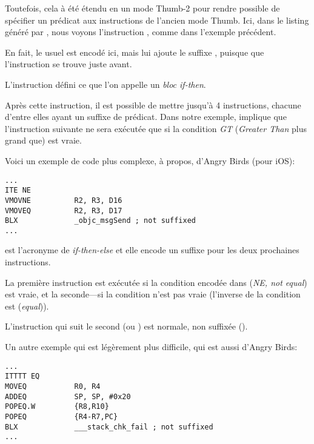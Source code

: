 
Toutefois, cela à été étendu en un mode Thumb-2 pour rendre possible de spécifier
un prédicat aux instructions de l'ancien mode Thumb.
Ici, dans le listing généré par \IDA, nous voyons l'instruction , comme
dans l'exemple précédent.

En fait, le  usuel est encodé ici, mais \IDA lui ajoute le suffixe ,
puisque que l'instruction  se trouve juste avant.

\label{ARM_Thumb_IT}
L'instruction  défini ce que l'on appelle un \emph{bloc if-then}.

Après cette instruction, il est possible de mettre jusqu'à 4 instructions, chacune
d'entre elles ayant un suffixe de prédicat.
Dans notre exemple,  implique que l'instruction suivante ne sera exécutée
que si la condition \emph{GT} (\emph{Greater Than} plus grand que) est vraie.

Voici un exemple de code plus complexe, à propos, d'Angry Birds (pour iOS):

\begin{lstlisting}[caption=Angry Birds Classic,style=customasmARM]
...
ITE NE
VMOVNE          R2, R3, D16
VMOVEQ          R2, R3, D17
BLX             _objc_msgSend ; not suffixed
...
\end{lstlisting}

 est l'acronyme de \emph{if-then-else}
et elle encode un suffixe pour les deux prochaines instructions.

La première instruction est exécutée si la condition encodée dans  (\emph{NE, not equal})
est vraie, et la seconde---si la condition n'est pas vraie (l'inverse de la condition
 est  (\emph{equal})).

L'instruction qui suit le second  (ou ) est normale, non suffixée
().

Un autre exemple qui est légèrement plus difficile, qui est aussi d'Angry Birds:

\begin{lstlisting}[caption=Angry Birds Classic,style=customasmARM]
...
ITTTT EQ
MOVEQ           R0, R4
ADDEQ           SP, SP, #0x20
POPEQ.W         {R8,R10}
POPEQ           {R4-R7,PC}
BLX             ___stack_chk_fail ; not suffixed
...
\end{lstlisting}

